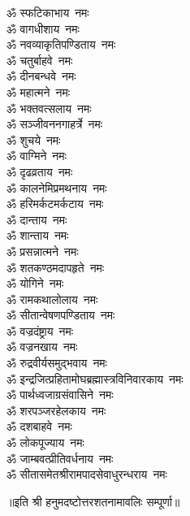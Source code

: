 \begin{multicols}{2}
\begin{flushleft}
ॐ स्फटिकाभाय~नमः\\
ॐ वागधीशाय~नमः\hfill{}\\
ॐ नवव्याकृतिपण्डिताय~नमः\\
ॐ चतुर्बाहवे~नमः\\
ॐ दीनबन्धवे~नमः\\
ॐ महात्मने~नमः\\
ॐ भक्तवत्सलाय~नमः\\
ॐ सञ्जीवननगाहर्त्रे~नमः\\
ॐ शुचये~नमः\\
ॐ वाग्मिने~नमः\\
ॐ दृढव्रताय~नमः\\
ॐ कालनेमिप्रमथनाय~नमः\hfill{}\\
ॐ हरिमर्कटमर्कटाय~नमः\\
ॐ दान्ताय~नमः\\
ॐ शान्ताय~नमः\\
ॐ प्रसन्नात्मने~नमः\\
ॐ शतकण्ठमदापहृते~नमः\\
ॐ योगिने~नमः\\
ॐ रामकथालोलाय~नमः\\
ॐ सीतान्वेषणपण्डिताय~नमः\\
ॐ वज्रदंष्ट्राय~नमः\\
ॐ वज्रनखाय~नमः\hfill{}\\
ॐ रुद्रवीर्यसमुद्भवाय~नमः\\
ॐ इन्द्रजित्प्रहितामोघ\-ब्रह्मास्त्रविनिवारकाय~नमः\\
ॐ पार्थध्वजाग्रसंवासिने~नमः\\
ॐ शरपञ्जरहेलकाय~नमः\\
ॐ दशबाहवे~नमः\\
ॐ लोकपूज्याय~नमः\\
ॐ जाम्बवत्प्रीतिवर्धनाय~नमः\\
ॐ सीतासमेतश्रीराम\-पादसेवाधुरन्धराय~नमः\\
\end{flushleft}
\end{multicols}
॥इति श्री हनुमदष्टोत्तरशतनामावलिः सम्पूर्णा॥
